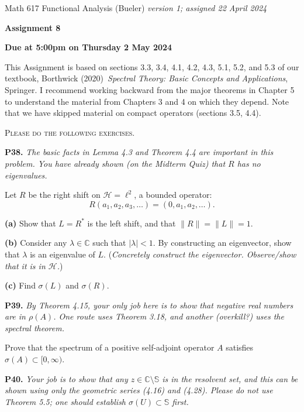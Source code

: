 \documentclass[12pt]{amsart}
\newcommand{\cH}{\mathcal{H}}
\newcommand{\CC}{\mathbb{C}}
\newcommand{\prob}[1]{\bigskip\noindent\textbf{#1.}\quad }
\newcommand{\epart}[1]{\medskip\noindent\textbf{(#1)}\quad }
\begin{document}
\scriptsize \noindent Math 617 Functional Analysis (Bueler) \hfill \emph{version 1; assigned 22 April 2024}
\normalsize\medskip

\Large\centerline{\textbf{Assignment 8}}
\large
\medskip

\centerline{\textbf{Due at 5:00pm on Thursday 2 May 2024}}
\medskip
\normalsize

\thispagestyle{empty}

\bigskip
\noindent This Assignment is based on sections 3.3, 3.4, 4.1, 4.2, 4.3, 5.1, 5.2, and 5.3 of our textbook, Borthwick (2020)~\emph{Spectral Theory: Basic Concepts and Applications}, Springer.  I recommend working backward from the major theorems in Chapter 5 to understand the material from Chapters 3 and 4 on which they depend.  Note that we have skipped material on compact operators (sections 3.5, 4.4).

\medskip
\noindent \textsc{Please do the following exercises.}
\smallskip

\renewcommand{\SS}{\mathbb{S}}


\prob{P38}  \emph{The basic facts in Lemma 4.3 and Theorem 4.4 are important in this problem.  You have already shown (on the Midterm Quiz) that $R$ has no eigenvalues.}

\medskip\noindent Let $R$ be the right shift on $\cH=\ell^2$, a bounded operator:
	$$R (a_1,a_2,a_3,\dots) = (0,a_1,a_2,\dots).$$

\epart{a}  Show that $L=R^*$ is the left shift, and that $\|R\|=\|L\|=1$.

\epart{b}  Consider any $\lambda\in\CC$ such that $|\lambda|<1$.  By constructing an eigenvector, show that $\lambda$ is an eigenvalue of $L$.  (\emph{Concretely construct the eigenvector.  Observe/show that it is in $\cH$.})

\epart{c}  Find $\sigma(L)$ and $\sigma(R)$.


\prob{P39}  \emph{By Theorem 4.15, your only job here is to show that negative real numbers are in $\rho(A)$.  One route uses Theorem 3.18, and another (overkill?) uses the spectral theorem.}

\medskip\noindent Prove that the spectrum of a positive self-adjoint operator $A$ satisfies $\sigma(A) \subset [0,\infty)$.


\prob{P40}  \emph{Your job is to show that any $z\in\CC\setminus \SS$ is in the resolvent set, and this can be shown using only the geometric series (4.16) and (4.28).  Please do not use Theorem 5.5; one should establish $\sigma(U) \subset \SS$ first.}
\end{document}
